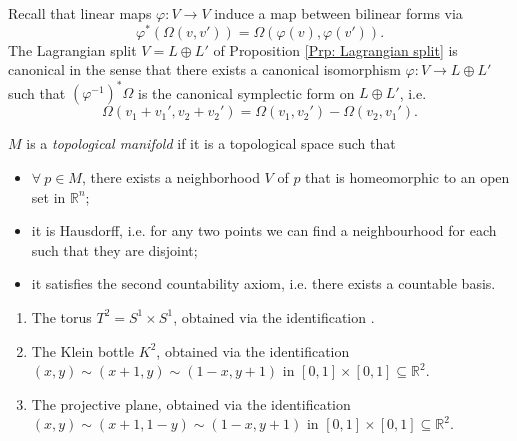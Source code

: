 \begin{Rmk}\label{Rmk: The Lagrangian split is canonical}
    Recall that linear maps $\varphi:V\to V$ induce a map between bilinear forms via
    \[
    \varphi^\ast(\Omega(v,v')) = \Omega(\varphi(v),\varphi(v')).
    \]
    The Lagrangian split $V=L\oplus L'$ of Proposition \ref{Prp: Lagrangian split} is canonical in the sense that there exists a canonical isomorphism $\varphi:V\to L\oplus L'$ such that $(\varphi^{-1})^\ast\Omega$ is the canonical symplectic form on $L\oplus L'$, i.e.
    \[
    \Omega(v_1+v_1', v_2+v_2') = \Omega(v_1,v_2') - \Omega(v_2,v_1').
    \]

\end{Rmk}

\begin{Dfn}\label{Dfn: Topological manifold}
    $M$ is a \emph{topological manifold} if it is a topological space such that
    \begin{itemize}

        \item $\forall \ p\in M$, there exists a neighborhood $V$ of $p$ that is homeomorphic to an open set in $\mathbb{R}^n$;

        \item it is Hausdorff, i.e. for any two points we can find a neighbourhood for each such that they are disjoint;

        \item it satisfies the second countability axiom, i.e. there exists a countable basis.
    \end{itemize}
\end{Dfn}

\begin{Exp}\leavevmode
    \begin{enumerate}[label=\ExpLbl]

        \item The torus $T^2=S^1\times S^1$, obtained via the identification .

        \item The Klein bottle $K^2$, obtained via the identification $(x,y)\sim (x+1,y)\sim (1-x,y+1)$ in $[0,1]\times[0,1]\subseteq \mathbb{R}^2$.

        \item The projective plane, obtained via the identification $(x,y)\sim (x+1,1-y)\sim (1-x,y+1)$ in $[0,1]\times[0,1]\subseteq \mathbb{R}^2$.
    \end{enumerate}
\end{Exp}

